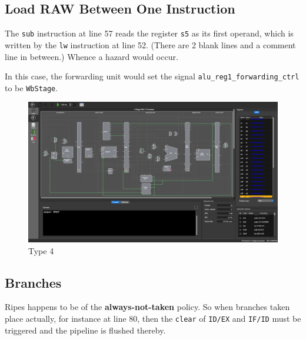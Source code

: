 \documentclass[12pt, a4paper]{article}
\begin{document}
\subsection{Load RAW Between One Instruction}

The \texttt{sub} instruction at line 57 reads the register \texttt{s5} as its first operand, which is written by the \texttt{lw} instruction at line 52. (There are 2 blank lines and a comment line in between.) Whence a hazard would occur.

In this case, the forwarding unit would set the signal \texttt{alu\_reg1\_forwarding\_ctrl} to be \texttt{WbStage}.

\begin{figure}[htbp]
\centering
\includegraphics[width=\linewidth]{4}
\caption{Type 4}
\label{fig:4}
\end{figure}

\pagebreak[4]

\subsection{Branches}

\textsf{Ripes} happens to be of the \textbf{always-not-taken} policy. So when  branches taken place actually, for instance at line 80, then the \texttt{clear} of \texttt{ID/EX} and \texttt{IF/ID} must be triggered and the pipeline is flushed thereby.
\end{document}
